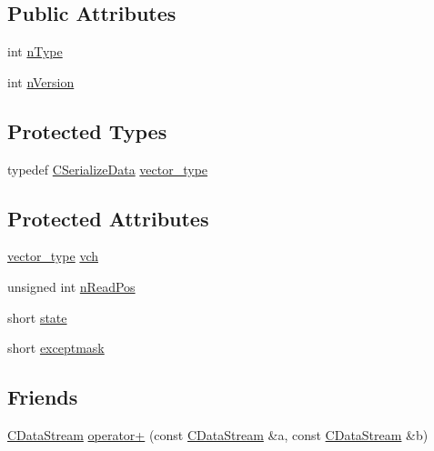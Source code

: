 \subsection*{Public Attributes}
\begin{DoxyCompactItemize}
\item 
int \hyperlink{class_c_data_stream_a2b646679e24cf6f382fe8ab2d4f50f35}{n\+Type}
\item 
int \hyperlink{class_c_data_stream_a074998c6b7c8aa17a1a90dbc414b605d}{n\+Version}
\end{DoxyCompactItemize}
\subsection*{Protected Types}
\begin{DoxyCompactItemize}
\item 
typedef \hyperlink{serialize_8h_a77935f92ff5ba1d71d692166f6ce0c1b}{C\+Serialize\+Data} \hyperlink{class_c_data_stream_a5e86187632a0d6cea39f3ea525427e27}{vector\+\_\+type}
\end{DoxyCompactItemize}
\subsection*{Protected Attributes}
\begin{DoxyCompactItemize}
\item 
\hyperlink{class_c_data_stream_a5e86187632a0d6cea39f3ea525427e27}{vector\+\_\+type} \hyperlink{class_c_data_stream_ac875adb8c720c48abd1a7c82f3452dda}{vch}
\item 
unsigned int \hyperlink{class_c_data_stream_af1c6a23b6725406d8f3464036a595556}{n\+Read\+Pos}
\item 
short \hyperlink{class_c_data_stream_a45d5d8e33a27a84f26038b898adf3d43}{state}
\item 
short \hyperlink{class_c_data_stream_a81a6caf76267890a0f602185deb028d4}{exceptmask}
\end{DoxyCompactItemize}
\subsection*{Friends}
\begin{DoxyCompactItemize}
\item 
\hyperlink{class_c_data_stream}{C\+Data\+Stream} \hyperlink{class_c_data_stream_ae9d127e586618900bc753dfda97e9401}{operator+} (const \hyperlink{class_c_data_stream}{C\+Data\+Stream} \&a, const \hyperlink{class_c_data_stream}{C\+Data\+Stream} \&b)
\end{DoxyCompactItemize}


